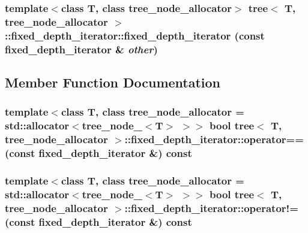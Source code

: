 \hypertarget{classtree_1_1fixed__depth__iterator_4416f43946317c249652270fec7c84a6}{
\subsubsection{\setlength{\rightskip}{0pt plus 5cm}template$<$class T, class tree\_\-node\_\-allocator$>$ {\bf tree}$<$ T, tree\_\-node\_\-allocator $>$::fixed\_\-depth\_\-iterator::fixed\_\-depth\_\-iterator (const {\bf fixed\_\-depth\_\-iterator} \& {\em other})}}
\label{classtree_1_1fixed__depth__iterator_4416f43946317c249652270fec7c84a6}




\subsection{Member Function Documentation}
\hypertarget{classtree_1_1fixed__depth__iterator_cb39be8cb92b1acd5aca197ad6df179b}{
\subsubsection{\setlength{\rightskip}{0pt plus 5cm}template$<$class T, class tree\_\-node\_\-allocator = std::allocator$<$tree\_\-node\_\-$<$T$>$ $>$$>$ bool {\bf tree}$<$ T, tree\_\-node\_\-allocator $>$::fixed\_\-depth\_\-iterator::operator== (const {\bf fixed\_\-depth\_\-iterator} \&) const}}
\label{classtree_1_1fixed__depth__iterator_cb39be8cb92b1acd5aca197ad6df179b}


\hypertarget{classtree_1_1fixed__depth__iterator_978b6d94930a7a6e4f3464fa24e502b8}{
\subsubsection{\setlength{\rightskip}{0pt plus 5cm}template$<$class T, class tree\_\-node\_\-allocator = std::allocator$<$tree\_\-node\_\-$<$T$>$ $>$$>$ bool {\bf tree}$<$ T, tree\_\-node\_\-allocator $>$::fixed\_\-depth\_\-iterator::operator!= (const {\bf fixed\_\-depth\_\-iterator} \&) const}}
\label{classtree_1_1fixed__depth__iterator_978b6d94930a7a6e4f3464fa24e502b8}


